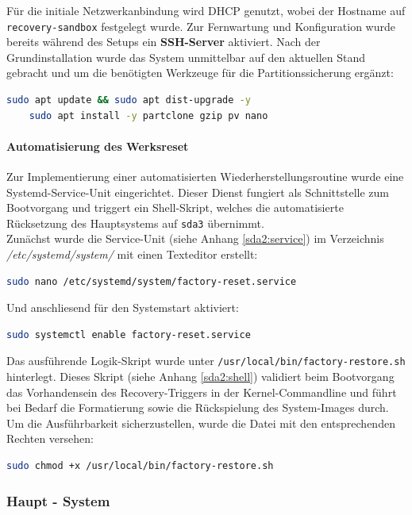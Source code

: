 \documentclass[11pt,
a4paper,
numbers=nonperiod,
footsepline,
oneside,
numbers=noenddot,
bibliography=totoc
]{scrartcl}
\begin{document}
Für die initiale Netzwerkanbindung wird DHCP genutzt, wobei der Hostname auf \texttt{recovery-sandbox} festgelegt wurde. Zur Fernwartung und Konfiguration wurde bereits während des Setups ein \textbf{SSH-Server} aktiviert. Nach der Grundinstallation wurde das System unmittelbar auf den aktuellen Stand gebracht und um die benötigten Werkzeuge für die Partitionssicherung ergänzt:

\begin{lstlisting}[language=bash]
	sudo apt update && sudo apt dist-upgrade -y
	sudo apt install -y partclone gzip pv nano
\end{lstlisting}

\paragraph{Automatisierung des Werksreset}
Zur Implementierung einer automatisierten Wiederherstellungsroutine wurde eine Systemd-Service-Unit eingerichtet. Dieser Dienst fungiert als Schnittstelle zum Bootvorgang und triggert ein Shell-Skript, welches die automatisierte Rücksetzung des Hauptsystems auf \texttt{sda3} übernimmt.\\

Zunächst wurde die Service-Unit (siehe Anhang \ref{sda2:service}) im Verzeichnis \emph{/etc/systemd/system/} mit einen Texteditor erstellt:
\begin{lstlisting}[language=bash]
	sudo nano /etc/systemd/system/factory-reset.service
\end{lstlisting}

\bigskip
Und anschliesend für den Systemstart aktiviert:
\begin{lstlisting}[language=bash]
	sudo systemctl enable factory-reset.service
\end{lstlisting}

\bigskip
Das ausführende Logik-Skript wurde unter \texttt{/usr/local/bin/factory-restore.sh} hinterlegt. Dieses Skript (siehe Anhang \ref{sda2:shell}) validiert beim Bootvorgang das Vorhandensein des Recovery-Triggers in der Kernel-Commandline und führt bei Bedarf die Formatierung sowie die Rückspielung des System-Images durch. Um die Ausführbarkeit sicherzustellen, wurde die Datei mit den entsprechenden Rechten versehen:
\begin{lstlisting}[language=bash]
	sudo chmod +x /usr/local/bin/factory-restore.sh
\end{lstlisting}
\newpage
\subsubsection{Haupt - System}
\end{document}

